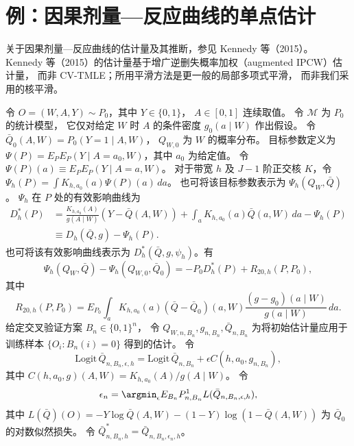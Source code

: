 \section{例：因果剂量—反应曲线的单点估计}

关于因果剂量—反应曲线的估计量及其推断，参见 Kennedy 等（2015）。
Kennedy 等（2015）的估计量基于增广逆删失概率加权（augmented IPCW）估计量，
而非 CV-TMLE；所用平滑方法是更一般的局部多项式平滑，
而非我们采用的核平滑。

令 $O=(W,A,Y)\sim P_0$，其中 $Y\in\{0,1\}$，
$A\in[0,1]$ 连续取值。
令 $\mathcal M$ 为 $P_0$ 的统计模型，
它仅对给定 $W$ 时 $A$ 的条件密度 $g_0(a\mid W)$ 作出假设。
令 $\bar Q_0(A,W)=P_0(Y=1\mid A,W)$，
$Q_{W,0}$ 为 $W$ 的概率分布。
目标参数定义为
$\Psi(P)=E_PE_P(Y\mid A=a_0,W)$，其中 $a_0$ 为给定值。
令 $\Psi(P)(a)\equiv E_PE_P(Y\mid A=a,W)$。
对于带宽 $h$ 及 $J-1$ 阶正交核 $K$，令
$\Psi_h(P)=\int K_{h,a_0}(a)\Psi(P)(a)\,da$。
也可将该目标参数表示为 $\Psi_h(Q_W,\bar Q)$。
$\Psi_h$ 在 $P$ 处的有效影响曲线为
\[
\begin{aligned}
 D_h^*(P)
 &=\frac{K_{h,a_0}(A)}{g(A\mid W)}(Y-\bar Q(A,W))
 +\int_aK_{h,a_0}(a)\bar Q(a,W)\,da-\Psi_h(P)\\
 &\equiv D_h(\bar Q,g)-\Psi_h(P).
\end{aligned}
\]
也可将该有效影响曲线表示为 $D_h^*(\bar Q,g,\psi_h)$。有
\[
 \Psi_h(Q_W,\bar Q)-\Psi_h(Q_{W,0},\bar Q_0)
 =-P_0D_h^*(P)+R_{20,h}(P,P_0),
\]
其中
\[
 R_{20,h}(P,P_0)=E_{P_0}\int_a
 K_{h,a_0}(a)(\bar Q-\bar Q_0)(a,W)
 \frac{(g-g_0)(a\mid W)}{g(a\mid W)}\,da.
\]
给定交叉验证方案 $B_n\in\{0,1\}^n$，
令 $Q_{W,n,B_n},g_{n,B_n},\bar Q_{n,B_n}$
为将初始估计量应用于训练样本 $\{O_i:B_n(i)=0\}$ 得到的估计。
令
\[
 \mathrm{Logit}\,\bar Q_{n,B_n,\epsilon,h}
 =\mathrm{Logit}\,\bar Q_{n,B_n}+\epsilon C(h,a_0,g_{n,B_n}),
\]
其中 $C(h,a_0,g)(A,W)=K_{h,a_0}(A)/g(A\mid W)$。
令
\[
 \epsilon_n=\argmin_\epsilon
 E_{B_n}P^1_{n,B_n}L(\bar Q_{n,B_n,\epsilon,h}),
\]
其中
$L(\bar Q)(O)=-Y\log\bar Q(A,W)-(1-Y)\log(1-\bar Q(A,W))$
为 $\bar Q_0$ 的对数似然损失。
令 $\bar Q^*_{n,B_n,h}=\bar Q_{n,B_n,\epsilon_n,h}$。


